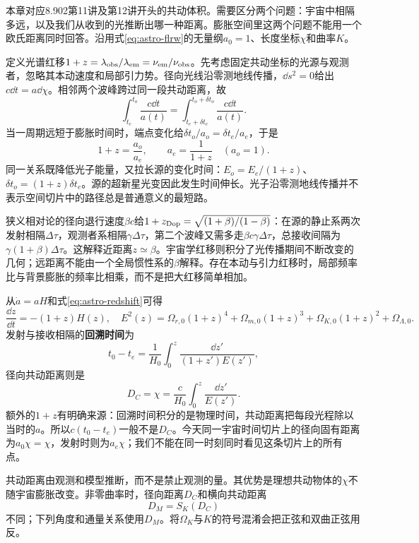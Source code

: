 本章对应8.902第11讲及第12讲开头的共动体积。需要区分两个问题：宇宙中相隔多远，以及我们从收到的光推断出哪一种距离。膨胀空间里这两个问题不能用一个欧氏距离同时回答。沿用式\eqref{eq:astro-flrw}的无量纲$a_0=1$、长度坐标$\chi$和曲率$K$。

定义光谱红移$1+z=\lambda_{\rm obs}/\lambda_{\rm em}=\nu_{\rm em}/\nu_{\rm obs}$。先考虑固定共动坐标的光源与观测者，忽略其本动速度和局部引力势。径向光线沿零测地线传播，$\dd s^2=0$给出$c\dd t=a\dd\chi$。相邻两个波峰跨过同一段共动距离，故
\[
 \int_{t_e}^{t_o}\frac{c\dd t}{a(t)}
 =\int_{t_e+\delta t_e}^{t_o+\delta t_o}\frac{c\dd t}{a(t)}.
\]
当一周期远短于膨胀时间时，端点变化给$\delta t_o/a_o=\delta t_e/a_e$，于是
\begin{equation}\label{eq:astro-redshift}
 1+z=\frac{a_o}{a_e},\qquad a_e=\frac1{1+z}\quad(a_o=1).
\end{equation}
同一关系既降低光子能量，又拉长源的变化时间：$E_o=E_e/(1+z)$、$\delta t_o=(1+z)\delta t_e$。源的超新星光变因此发生时间伸长。光子沿零测地线传播并不表示空间切片中的路径总是普通意义的最短路。

狭义相对论的径向退行速度$\beta c$给$1+z_{\rm Dop}=\sqrt{(1+\beta)/(1-\beta)}$：在源的静止系两次发射相隔$\Delta\tau$，观测者系相隔$\gamma\Delta\tau$，第二个波峰又需多走$\beta c\gamma\Delta\tau$，总接收间隔为$\gamma(1+\beta)\Delta\tau$。这解释近距离$z\simeq\beta$。宇宙学红移则积分了光传播期间不断改变的几何；远距离不能由一个全局惯性系的$\beta$解释。存在本动与引力红移时，局部频率比与背景膨胀的频率比相乘，而不是把大红移简单相加。

从$\dot a=aH$和式\eqref{eq:astro-redshift}可得
\[
 \frac{\dd z}{\dd t}=-(1+z)H(z),\quad
 E^2(z)=\Omega_{r,0}(1+z)^4+\Omega_{m,0}(1+z)^3
 +\Omega_{K,0}(1+z)^2+\Omega_{\Lambda,0}.
\]
发射与接收相隔的\textbf{回溯时间}为
\[
 t_0-t_e=\frac1{H_0}\int_0^z\frac{\dd z'}{(1+z')E(z')},
\]
径向共动距离则是
\begin{equation}\label{eq:astro-comoving-distance}
 D_C=\chi=\frac c{H_0}\int_0^z\frac{\dd z'}{E(z')}.
\end{equation}
额外的$1+z$有明确来源：回溯时间积分的是物理时间，共动距离把每段光程除以当时的$a$。所以$c(t_0-t_e)$一般不是$D_C$。今天同一宇宙时间切片上的径向固有距离为$a_0\chi=\chi$，发射时则为$a_e\chi$；我们不能在同一时刻同时看见这条切片上的所有点。

共动距离由观测和模型推断，而不是禁止观测的量。其优势是理想共动物体的$\chi$不随宇宙膨胀改变。非零曲率时，径向距离$D_C$和横向共动距离
\[
 D_M=S_K(D_C)
\]
不同；下列角度和通量关系使用$D_M$。将$\Omega_K$与$K$的符号混淆会把正弦和双曲正弦用反。

